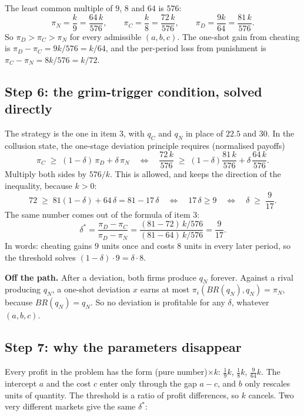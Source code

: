 \documentclass[11pt,a4paper]{article}
\begin{document}
The least common multiple of $9$, $8$ and $64$ is $576$:
\[
\pi_N = \frac{k}{9} = \frac{64\,k}{576}, \qquad
\pi_C = \frac{k}{8} = \frac{72\,k}{576}, \qquad
\pi_D = \frac{9k}{64} = \frac{81\,k}{576}.
\]
So $\pi_D > \pi_C > \pi_N$ for every admissible $(a, b, c)$. The one-shot gain from cheating is
$\pi_D - \pi_C = 9k/576 = k/64$, and the per-period loss from punishment is
$\pi_C - \pi_N = 8k/576 = k/72$.

\subsection*{Step 6: the grim-trigger condition, solved directly}

The strategy is the one in item 3, with $q_C$ and $q_N$ in place of $22.5$ and $30$. In the collusion
state, the one-stage deviation principle requires (normalised payoffs)
\[
\pi_C \;\ge\; (1-\delta)\,\pi_D + \delta\,\pi_N
\quad\Longleftrightarrow\quad
\frac{72\,k}{576} \;\ge\; (1-\delta)\frac{81\,k}{576} + \delta\,\frac{64\,k}{576}.
\]
Multiply both sides by $576/k$. This is allowed, and keeps the direction of the inequality,
because $k > 0$:
\[
72 \;\ge\; 81(1-\delta) + 64\,\delta = 81 - 17\,\delta
\quad\Longleftrightarrow\quad 17\,\delta \ge 9
\quad\Longleftrightarrow\quad \delta \;\ge\; \frac{9}{17}.
\]
The same number comes out of the formula of item 3:
\[
\delta^* = \frac{\pi_D - \pi_C}{\pi_D - \pi_N} = \frac{(81 - 72)\,k/576}{(81 - 64)\,k/576} = \frac{9}{17}.
\]
In words: cheating gains $9$ units once and costs $8$ units in every later period, so the threshold
solves $(1-\delta)\cdot 9 = \delta\cdot 8$.

\textbf{Off the path.} After a deviation, both firms produce $q_N$ forever. Against a rival producing
$q_N$, a one-shot deviation $x$ earns at most $\pi_i(BR(q_N), q_N) = \pi_N$, because $BR(q_N) = q_N$.
So no deviation is profitable for any $\delta$, whatever $(a, b, c)$.

\subsection*{Step 7: why the parameters disappear}

Every profit in the problem has the form (pure number)$\times k$: $\tfrac19 k$, $\tfrac18 k$, $\tfrac{9}{64}k$.
The intercept $a$ and the cost $c$ enter only through the gap $a - c$, and $b$ only rescales units of
quantity. The threshold is a ratio of profit differences, so $k$ cancels. Two very different markets
give the same $\delta^*$:
\end{document}
